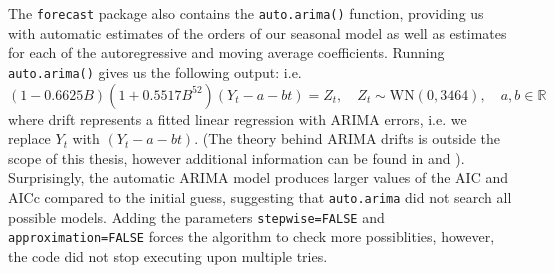 \documentclass[a4paper, oneside]{discothesis}
\begin{document}
The \texttt{forecast} package also contains the \texttt{auto.arima()} function, providing us with automatic estimates of the orders of our seasonal model as well as estimates for each of the autoregressive and moving average coefficients. Running \texttt{auto.arima()} gives us the following output:
i.e.
\begin{equation*}
    (1-0.6625B)(1+0.5517B^{52})(Y_t-a-bt) = Z_t, \quad Z_t \sim \mathrm{WN}(0, 3464), \quad a, b \in \mathbb{R}
\end{equation*}
where drift represents a fitted linear regression with ARIMA errors, i.e. we replace $Y_t$ with $(Y_t-a-bt)$. (The theory behind ARIMA drifts is outside the scope of this thesis, however additional information can be found in \cite{drift_R} and \cite{drift}). Surprisingly, the automatic ARIMA model produces larger values of the AIC and AICc compared to the initial guess, suggesting that \texttt{auto.arima} did not search all possible models. Adding the parameters \texttt{stepwise=FALSE} and \texttt{approximation=FALSE} forces the algorithm to check more possiblities, however, the code did not stop executing upon multiple tries.
\end{document}
